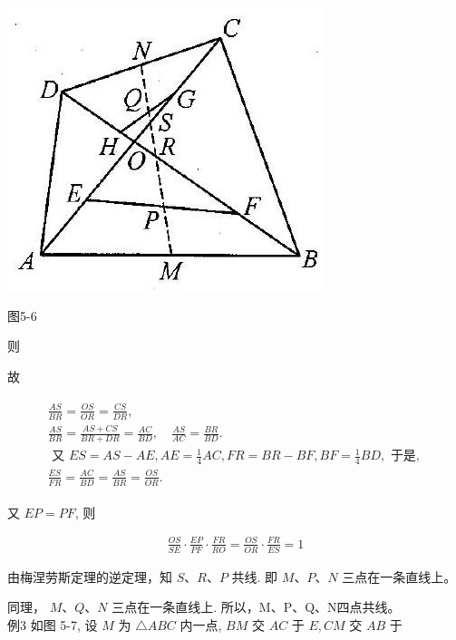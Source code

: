 \documentclass[10pt]{article}
\begin{document}
\begin{center}
\includegraphics[max width=\textwidth]{2024_10_30_2c8f45efd4a519b08e1ag-050}
\end{center}

图5-6

则

故

\begin{align*}
\begin{gathered}
\frac{A S}{B R}=\frac{O S}{O R}=\frac{C S}{D R}, \\
\frac{A S}{B R}=\frac{A S+C S}{B R+D R}=\frac{A C}{B D}, \quad \frac{A S}{A C}=\frac{B R}{B D} . \\
\text { 又 } E S=A S-A E, A E=\frac{1}{4} A C, F R=B R-B F, B F=\frac{1}{4} B D, \text { 于是, } \\
\frac{E S}{F R}=\frac{A C}{B D}=\frac{A S}{B R}=\frac{O S}{O R} .
\end{gathered}
\end{align*}

又 $E P=P F$, 则

\begin{align*}
\frac{O S}{S E} \cdot \frac{E P}{P F} \cdot \frac{F R}{R O}=\frac{O S}{O R} \cdot \frac{F R}{E S}=1
\end{align*}

由梅涅劳斯定理的逆定理，知 $S 、 R 、 P$ 共线. 即 $M 、 P 、 N$ 三点在一条直线上。

同理， $M 、 Q 、 N$ 三点在一条直线上. 所以，M、P、Q、N四点共线。\\
例3 如图 5-7, 设 $M$ 为 $\triangle A B C$ 内一点, $B M$ 交 $A C$ 于 $E, C M$ 交 $A B$ 于
\end{document}
